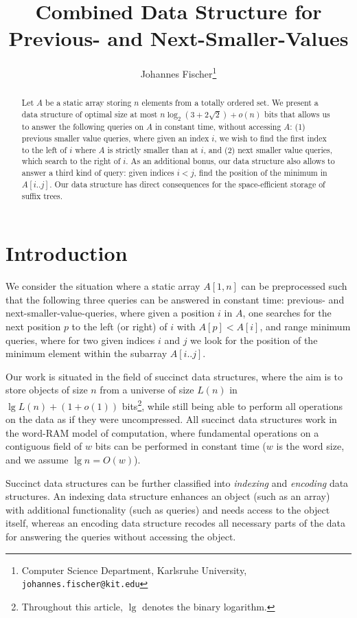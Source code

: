 \documentclass[11pt,onecolumn,final]{article} \usepackage{a4}
\title{Combined Data Structure for Previous- and Next-Smaller-Values}
\author{
  Johannes Fischer\thanks{Computer Science Department, Karlsruhe
    University, \texttt{johannes.fischer@kit.edu}}
}
\date{}
\theoremstyle{plain}
\theoremstyle{remark}
\begin{document}
\maketitle

\begin{abstract}
Let $A$ be a static array storing $n$ elements from a totally ordered set. We present a data structure of optimal size at most $n\log_2(3+2\sqrt{2})+o(n)$ bits that allows us to answer the following queries on $A$ in constant time, without accessing $A$: (1) previous smaller value queries, where given an index $i$, we wish to find the first index to the left of $i$ where $A$ is strictly smaller than at $i$, and (2) next smaller value queries, which search to the right of $i$. As an additional bonus, our data structure also allows to answer a third kind of query: given indices $i<j$, find the position of the minimum in $A[i..j]$. Our data structure has direct consequences for the space-efficient storage of suffix trees.
\end{abstract}

\section{Introduction}
We consider the situation where a static array $A[1,n]$ can be preprocessed such that the following three queries can be answered in constant time: previous- and next-smaller-value-queries, where given a position $i$ in $A$, one searches for the next position $p$ to the left (or right) of $i$ with $A[p] < A[i]$, and range minimum queries, where for two given indices $i$ and $j$ we look for the position of the minimum element within the subarray $A[i..j]$.

Our work is situated in the field of succinct data structures, where the aim is to store objects of size $n$ from a universe of size $L(n)$ in $\lg L(n) + (1+o(1))$ bits\footnote{Throughout this article, $\lg$ denotes the binary logarithm.}, while still being able to perform all operations on the data as if they were uncompressed. All succinct data structures work in the word-RAM model of computation, where fundamental operations on a contiguous field of $w$ bits can be performed in constant time ($w$ is the word size, and we assume $\lg n=O(w)$).

Succinct data structures can be further classified into \emph{indexing} and \emph{encoding} data structures. An indexing data structure enhances an object (such as an array) with additional functionality (such as queries) and needs access to the object itself, whereas an encoding data structure recodes all necessary parts of the data for answering the queries without accessing the object.
\end{document}
